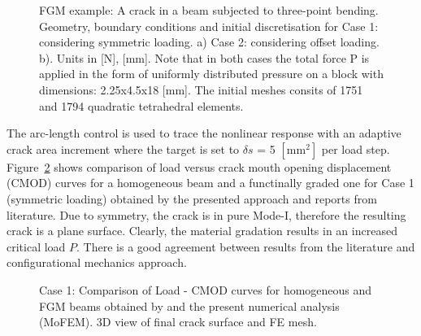 \documentclass[onecolumn]{svjour3}
\begin{document}
% 
% 
% 
\begin{figure}[h!]

	\vspace{-1.5cm}
	\centering
	\begin{center}
	\def\svgwidth{14cm} 
	\caption{FGM example: A crack in a beam subjected to three-point bending. Geometry, boundary conditions and initial discretisation for Case 1: considering symmetric loading. a) Case 2: considering offset loading. b). Units in [N], [mm]. Note that in both cases the total force P is applied in the form of uniformly distributed pressure on a block with dimensions: 2.25x4.5x18 [mm]. The initial meshes consits of 1751 and 1794 quadratic tetrahedral elements.}
	\label{fig:fgm_mesh_load}
	\end{center}
\end{figure}
% 
% 
The arc-length control is used to trace the nonlinear response with an adaptive crack area increment where the target is set to $\delta s$ = 5 $[\mathrm{mm}^2]$ per load step. Figure~\ref{fig:fgm_case1} shows comparison of load versus crack mouth opening displacement (CMOD) curves for a homogeneous beam and a functinally graded one for Case 1 (symmetric loading) obtained by the presented approach and reports from literature. Due to symmetry, the crack is in pure Mode-I, therefore the resulting crack is a plane surface. Clearly, the material gradation results in an increased critical load $P$. There is a good agreement between results from the literature and configurational mechanics approach. 
% 
% 
\begin{figure}
	\centering
	\caption{Case 1: Comparison of Load - CMOD curves for homogeneous and FGM beams obtained by \citep{kim2004simulation} and the present numerical analysis (MoFEM). 3D view of final crack surface and FE mesh.}
	\label{fig:fgm_case1}
\end{figure}
\end{document}
